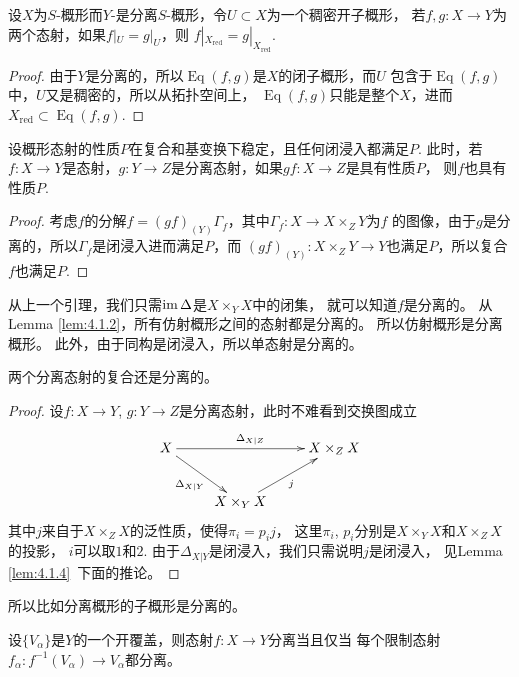 \begin{pro}
	设$X$为$S$-概形而$Y$-是分离$S$-概形，令$U\subset X$为一个稠密开子概形，
	若$f,g:X\to Y$为两个态射，如果$f|_U=g|_U$，则
	$f|_{X_{\operatorname{red}}}=g|_{X_{\operatorname{red}}}$.
\end{pro}

\begin{proof}
	由于$Y$是分离的，所以$\operatorname{Eq}(f,g)$是$X$的闭子概形，而$U$
	包含于$\operatorname{Eq}(f,g)$中，$U$又是稠密的，所以从拓扑空间上，
	$\operatorname{Eq}(f,g)$只能是整个$X$，进而
	$X_{\operatorname{red}}\subset\operatorname{Eq}(f,g)$.
\end{proof}

\begin{pro}
	设概形态射的性质$P$在复合和基变换下稳定，且任何闭浸入都满足$P$. 此时，若
	$f:X\to Y$是态射，$g:Y\to Z$是分离态射，如果$gf:X\to Z$是具有性质$P$，
	则$f$也具有性质$P$.
\end{pro}

\begin{proof}
	考虑$f$的分解$f=(gf)_{(Y)}\Gamma_f$，其中$\Gamma_f:X\to X\times_Z Y$为$f$
	的图像，由于$g$是分离的，所以$\Gamma_f$是闭浸入进而满足$P$，而
	$(gf)_{(Y)}:X\times_Z Y\to Y$也满足$P$，所以复合$f$也满足$P$.
\end{proof}

从上一个引理，我们只需$\operatorname{im} \Delta$是$X\times_Y X$中的闭集，
就可以知道$f$是分离的。
从Lemma \ref{lem:4.1.2}，所有仿射概形之间的态射都是分离的。
所以仿射概形是分离概形。
此外，由于同构是闭浸入，所以单态射是分离的。

\begin{pro}
两个分离态射的复合还是分离的。
\end{pro}

\begin{proof}
设$f:X\to Y$, $g:Y\to Z$是分离态射，此时不难看到交换图成立
\[
\begin{xy}
\xymatrix{
	X \ar[rr]^{\Delta_{X|Z}}\ar[dr]_{\Delta_{X|Y}}&&X\times_Z X\\
	&X\times_Y X \ar[ur]_j&
	}
\end{xy}
\]
其中$j$来自于$X\times_Z X$的泛性质，使得$\pi_i=p_ij$，
这里$\pi_i$, $p_i$分别是$X\times_Y X$和$X\times_Z X$的投影，
$i$可以取$1$和$2$. 由于$\Delta_{X|Y}$是闭浸入，我们只需说明$j$是闭浸入，
见Lemma \ref{lem:4.1.4}~下面的推论。
\end{proof}

所以比如分离概形的子概形是分离的。

\begin{pro}
	设$\{V_\alpha\}$是$Y$的一个开覆盖，则态射$f:X\to Y$分离当且仅当
	每个限制态射$f_\alpha:f^{-1}(V_\alpha)\to V_\alpha$都分离。
\end{pro}

